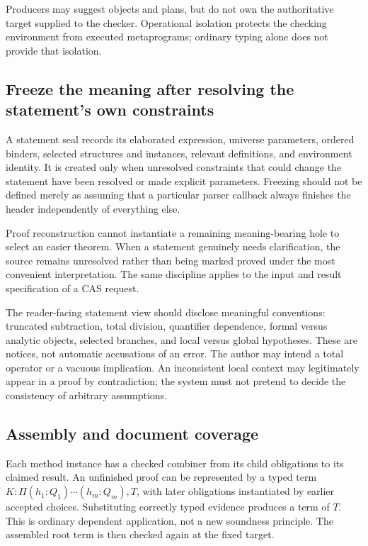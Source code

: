 \documentclass[11pt,letterpaper]{article}
\theoremstyle{definition}
\theoremstyle{remark}
\begin{document}
Producers may suggest objects and plans, but do not own the authoritative target supplied
to the checker. Operational isolation protects the checking environment from
executed metaprograms; ordinary typing alone does not provide that isolation.

\subsection{Freeze the meaning after resolving the statement's own constraints}
A statement seal records its elaborated expression, universe parameters,
ordered binders, selected structures and instances, relevant definitions,
and environment identity. It is created only when unresolved constraints that
could change the statement have been resolved or made explicit parameters.
Freezing should not be defined merely as assuming that a particular parser
callback always finishes the header independently of everything else.

Proof reconstruction cannot instantiate a remaining meaning-bearing hole to
select an easier theorem. When a statement genuinely needs clarification,
the source remains unresolved rather than being marked proved under the most
convenient interpretation. The same discipline applies to the input and result
specification of a CAS request.

The reader-facing statement view should disclose meaningful conventions:
truncated subtraction, total division, quantifier dependence, formal versus
analytic objects, selected branches, and local versus global hypotheses.
These are notices, not automatic accusations of an error. The author may
intend a total operator or a vacuous implication. An inconsistent local
context may legitimately appear in a proof by contradiction; the system
must not pretend to decide the consistency of arbitrary assumptions.

\subsection{Assembly and document coverage}
Each method instance has a checked combiner from its child obligations to its
claimed result. An unfinished proof can be represented by a typed term
$K:\Pi(h_1:Q_1)\cdots(h_m:Q_m),T$, with later obligations instantiated by earlier
accepted choices. Substituting correctly typed evidence produces a term of $T$.
This is ordinary dependent application, not a new soundness principle. The
assembled root term is then checked again at the fixed target.
\end{document}
